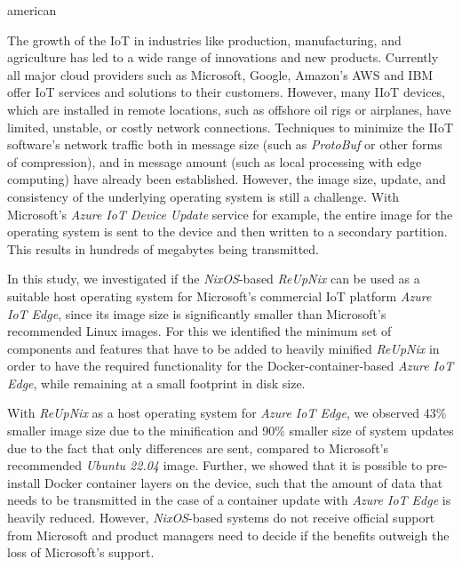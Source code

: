 \begin{otherlanguage*}{american}

The growth of the \ac{IoT} in industries like production, manufacturing, and
agriculture has led to a wide range of innovations and new products. Currently
all major cloud providers such as Microsoft, Google, Amazon's AWS and IBM offer
\ac{IoT} services and solutions to their customers. However, many \ac{IIoT} devices,
which are installed in remote locations, such as offshore oil rigs or airplanes,
have limited, unstable, or costly network connections. Techniques to
minimize the \ac{IIoT} software's network traffic both in message size
(such as \textit{ProtoBuf} or other forms of compression), and in message amount
(such as local processing with edge computing) have already been established.
However, the image size, update, and consistency of the underlying operating
system is still a challenge. With Microsoft's \textit{Azure IoT Device
Update} service for example, the entire image for the operating system is sent
to the device and then written to a secondary partition. This results in hundreds
of megabytes being transmitted.

In this study, we investigated if the \textit{NixOS}-based \textit{ReUpNix}
can be used as a suitable host operating system for Microsoft's commercial
\ac{IoT} platform \textit{Azure IoT Edge}, since its image size is significantly
smaller than Microsoft's recommended Linux images.
 For this we identified the
minimum set of components and features that have to be added to heavily minified
\textit{ReUpNix} in order to have the required functionality for the
Docker-container-based \textit{Azure IoT Edge}, while remaining at a small
footprint in disk size.

With \textit{ReUpNix} as a host operating system for \textit{Azure IoT Edge}, we
observed 43\% smaller image size due to the minification and 90\% smaller size of
system updates due to the fact that only differences are sent, compared to
Microsoft's recommended \textit{Ubuntu 22.04}
image. Further, we showed that it is possible to pre-install Docker container
layers on the device, such that the amount of data that needs to be transmitted
in the case of a container update with \textit{Azure IoT Edge} is heavily reduced.
However, \textit{NixOS}-based systems do not receive official support from
Microsoft and product managers need to decide if the benefits outweigh the loss
of Microsoft's support.

\end{otherlanguage*}


